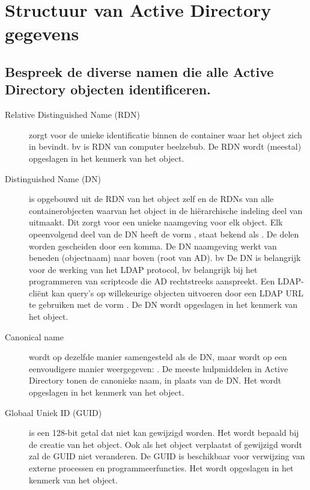 \chapter{Structuur van Active Directory gegevens}

\section{Bespreek de diverse namen die alle Active Directory objecten
identificeren.}

\begin{description}
	\item[Relative Distinguished Name (RDN)] zorgt voor de unieke
		identificatie binnen de container waar het object zich in
		bevindt. bv  is RDN van computer beelzebub.
		De RDN wordt (meestal) opgeslagen in het kenmerk  van
		het object.
	\item[Distinguished Name (DN)] is opgebouwd uit de RDN van het object
		zelf en de RDNs van alle containerobjecten waarvan het object in
		de hiërarchische indeling deel van uitmaakt. Dit zorgt voor een
		unieke naamgeving voor elk object. Elk opeenvolgend deel van de
		DN heeft de vorm , staat bekend als
		. De delen worden gescheiden door een
		komma. De DN naamgeving werkt van beneden (objectnaam) naar
		boven (root van AD). bv
		De DN is belangrijk voor de werking van het LDAP protocol, bv
		belangrijk bij het programmeren van scriptcode die AD
		rechtstreeks aanspreekt. Een LDAP-cliënt kan query's op
		willekeurige objecten uitvoeren door een LDAP URL te gebruiken
		met de vorm . De DN
		wordt opgeslagen in het kenmerk  van
		het object.
	\item[Canonical name] wordt op dezelfde manier samengesteld als de DN,
		maar wordt op een eenvoudigere manier weergegeven:
		. De meeste hulpmiddelen in
		Active Directory tonen de canonieke naam, in plaats van de DN.
		Het wordt opgeslagen in het kenmerk  van
		het object.
	\item[Globaal Uniek ID (GUID)] is een 128-bit getal dat niet kan
		gewijzigd worden. Het wordt bepaald bij de creatie van het
		object. Ook als het object verplaatst of gewijzigd wordt zal de
		GUID niet veranderen. De GUID is beschikbaar voor verwijzing van
		externe processen en programmeerfuncties. Het wordt opgeslagen
		in het kenmerk  van het object.
\end{description}

